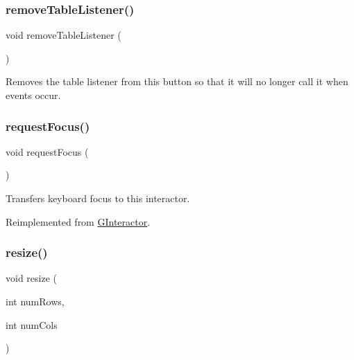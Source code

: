 \mbox{\label{classGTable_a5c18bacaf370f9c3da545f5c6e6e9515}} 
\subsubsection{\texorpdfstring{remove\+Table\+Listener()}{removeTableListener()}}
{\footnotesize\ttfamily void remove\+Table\+Listener (\begin{DoxyParamCaption}{ }\end{DoxyParamCaption})\hspace{0.3cm}{\ttfamily [virtual]}}



Removes the table listener from this button so that it will no longer call it when events occur. 

\mbox{\label{classGTable_a49b39e0eeaf5af829e8956e9055c5cdc}} 
\subsubsection{\texorpdfstring{request\+Focus()}{requestFocus()}}
{\footnotesize\ttfamily void request\+Focus (\begin{DoxyParamCaption}{ }\end{DoxyParamCaption})\hspace{0.3cm}{\ttfamily [virtual]}}



Transfers keyboard focus to this interactor. 



Reimplemented from \mbox{\hyperlink{classGInteractor_a519fb2ac767f8b2febbb50b898b8c8cb}{G\+Interactor}}.

\mbox{\label{classGTable_a600810b1a74ec9a062ce38666a9e7602}} 
\subsubsection{\texorpdfstring{resize()}{resize()}}
{\footnotesize\ttfamily void resize (\begin{DoxyParamCaption}\item[{int}]{num\+Rows,  }\item[{int}]{num\+Cols }\end{DoxyParamCaption})\hspace{0.3cm}{\ttfamily [virtual]}}



